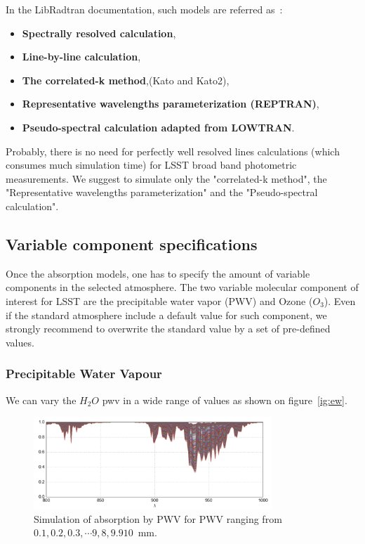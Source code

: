 \documentclass[a4paper]{article}
\begin{document}
In the LibRadtran documentation, such models are referred as~:
\begin{itemize}
\item {\bf Spectrally resolved  calculation},
\item {\bf Line-by-line calculation},
\item {\bf The correlated-k method},(Kato and Kato2),
\item {\bf Representative wavelengths parameterization (REPTRAN)},
\item {\bf Pseudo-spectral calculation adapted from LOWTRAN}. 
\end{itemize} 

Probably, there is no need for perfectly well resolved lines calculations (which consumes much simulation time) for LSST broad band photometric measurements.
We suggest to simulate only the "correlated-k method", the "Representative wavelengths parameterization" and the "Pseudo-spectral calculation".



\subsection{Variable component specifications}


Once the absorption models, one has to specify the amount of variable components in the selected atmosphere.
The two variable molecular component of interest for LSST are the precipitable water vapor (PWV) and Ozone ($O_3$).
Even if the standard atmosphere include a default value for such component, we strongly recommend to overwrite the standard value by a set of pre-defined values.


\subsubsection{Precipitable Water Vapour}


We can vary the $H_2O$ pwv in a wide range of values as shown on figure~\ref{ig:ew}.
\begin{figure}
\centering
\includegraphics[width=0.8\textwidth]{images/pwv}
\caption{\label{fig:ew}Simulation of absorption by PWV for PWV ranging from $0.1, 0.2,0.3, \cdots 9,8,9.910$~mm.}
\end{figure}
\end{document}
